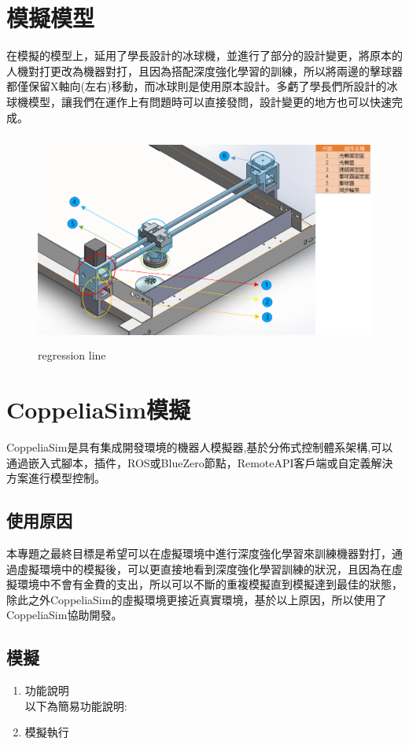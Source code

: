 \documentclass[14pt,a4paper]{report}  %
\begin{document}
\section{模擬模型}
 在模擬的模型上，延用了學長設計的冰球機，並進行了部分的設計變更，將原本的人機對打更改為機器對打，且因為搭配深度強化學習的訓練，所以將兩邊的擊球器都僅保留X軸向(左右)移動，而冰球則是使用原本設計。多虧了學長們所設計的冰球機模型，讓我們在運作上有問題時可以直接發問，設計變更的地方也可以快速完成。\\
\begin{figure}[hbt!]
\center
\includegraphics[height=7cm]{model}
\caption{regression line}
\end{figure}
\section{CoppeliaSim模擬}
 CoppeliaSim是具有集成開發環境的機器人模擬器,基於分佈式控制體系架構,可以通過嵌入式腳本，插件，ROS或BlueZero節點，RemoteAPI客戶端或自定義解決方案進行模型控制。\\
\subsection{使用原因}
 本專題之最終目標是希望可以在虛擬環境中進行深度強化學習來訓練機器對打，通過虛擬環境中的模擬後，可以更直接地看到深度強化學習訓練的狀況，且因為在虛擬環境中不會有金費的支出，所以可以不斷的重複模擬直到模擬達到最佳的狀態，除此之外CoppeliaSim的虛擬環境更接近真實環境，基於以上原因，所以使用了CoppeliaSim協助開發。\\
\subsection{模擬}
\begin{enumerate}

\item 功能說明\\
以下為簡易功能說明:
\item 模擬執行\\

\end{enumerate}
\end{document}

